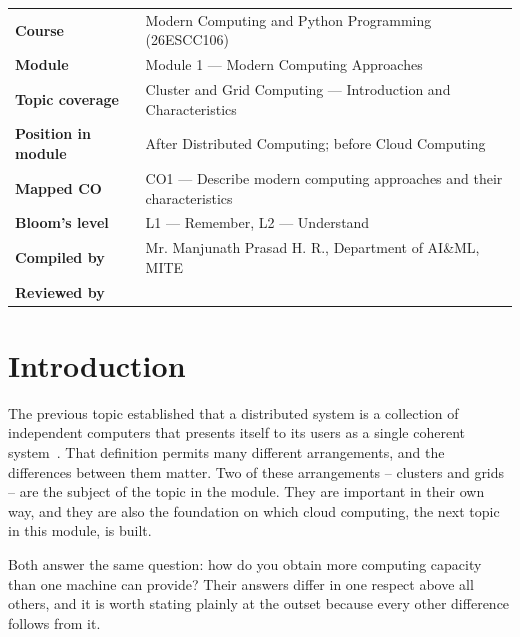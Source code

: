 \documentclass[../main.tex]{subfiles}
\begin{document}

\begin{tabularx}{\textwidth}{@{}>{\bfseries}p{3.4cm}L@{}}
\toprule
Course            & Modern Computing and Python Programming (26ESCC106) \\
Module            & Module 1 --- Modern Computing Approaches \\
Topic coverage    & Cluster and Grid Computing --- Introduction and Characteristics \\
Position in module& After Distributed Computing; before Cloud Computing \\
Mapped CO         & CO1 --- Describe modern computing approaches and their characteristics \\
Bloom's level     & L1 --- Remember, L2 --- Understand \\
Compiled by       & Mr. Manjunath Prasad H. R., Department of AI\&ML, MITE \\
Reviewed by       & \\
\bottomrule
\end{tabularx}


\section{Introduction}

The previous topic established that a distributed system is a collection of
independent computers that presents itself to its users as a single coherent
system~. That definition permits many different arrangements, and the
differences between them matter. Two of these arrangements -- clusters and
grids -- are the subject of the topic in the module. They are important in
their own way, and they are also the foundation on which cloud computing, the next
topic in this module, is built.

Both answer the same question: how do you obtain more computing capacity than
one machine can provide? Their answers differ in one respect above all
others, and it is worth stating plainly at the outset because every other
difference follows from it.
\end{document}

